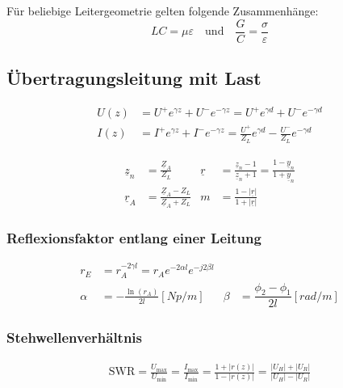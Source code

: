 Für beliebige Leitergeometrie gelten folgende Zusammenhänge:
\[
    LC = \mu\varepsilon \quad \text{und} \quad \frac{G}{C} = \frac{\sigma}{\varepsilon}
\]

\subsection{Übertragungsleitung mit Last}



\begin{align*}
    U(z) & = U^+ e^{\gamma z} + U^- e^{-\gamma z} = U^+ e^{\gamma d} + U^ - e^{-\gamma d}                      \\
    I(z) & = I^+ e^{\gamma z} + I^- e^{-\gamma z} = \frac{U^+}{Z_L}e^{\gamma d} - \frac{U^-}{Z_L}e^{-\gamma d}
\end{align*}

\begin{align*}
    \underline{z}_n & = \frac{\underline{Z}_A}{Z_L}                     & \underline{r} & = \frac{\underline{z}_n-1}{\underline{z}_n+1}= \frac{1-\underline{y}_n}{1+\underline{y}_n} \\
    \underline{r}_A & = \frac{\underline{Z}_A-Z_L}{\underline{Z}_A+Z_L} & m             & = \frac{1-|\underline{r}|}{1+|\underline{r}|}
\end{align*}

\subsubsection{Reflexionsfaktor entlang einer Leitung}
\begin{align*}
    r_E    & = r_A  ^{-2\gamma l} = r_A  e^{-2\alpha l} e^{-j2\beta l}                                                     \\
    \alpha & = -\frac{\ln(r_A)}{2l} [\si{Np/m}]                        & \beta & = \dfrac{\phi_2 -\phi_1}{2l} [\si{rad/m}]
\end{align*}

\subsubsection{Stehwellenverhältnis}
\begin{align*}
    \mathrm{SWR} = \frac{U_\text{max}}{U_\text{min}} =
    \frac{I_\text{max}}{I_\text{min}} = \frac{1+|r(z)|}{1-|r(z)|} =
    \frac{|U_H|+|U_R|}{|U_H|-|U_R|}
\end{align*}

